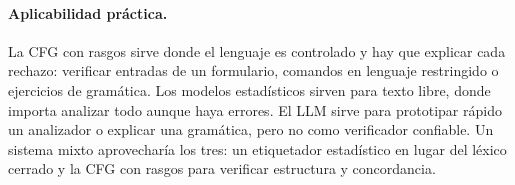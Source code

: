 \paragraph{Aplicabilidad práctica.} La CFG con rasgos sirve donde el lenguaje es controlado y
hay que explicar cada rechazo: verificar entradas de un formulario, comandos en lenguaje
restringido o ejercicios de gramática. Los modelos estadísticos sirven para texto libre, donde
importa analizar todo aunque haya errores. El LLM sirve para prototipar rápido un analizador o
explicar una gramática, pero no como verificador confiable. Un sistema mixto aprovecharía los
tres: un etiquetador estadístico en lugar del léxico cerrado y la CFG con rasgos para verificar
estructura y concordancia.
